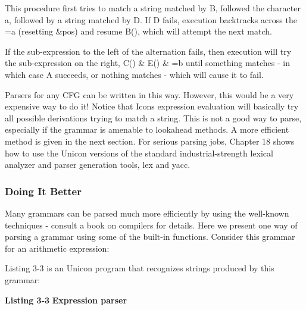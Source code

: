 This procedure first tries to match a string matched by \textsf{B},
followed the character \textsf{a}, followed by a string matched by
\textsf{D}. If \textsf{D} fails, execution
backtracks across the \textsf{={\textquotedbl}a{\textquotedbl}}
(resetting \textsf{\&pos}) and resume \textsf{B()}, which will attempt
the next match.

If the sub-expression to the left of the alternation fails, then execution will try the
sub-expression on the right, \textsf{C() \& E() \&
={\textquotedbl}b{\textquotedbl}} until something matches - in which
case \textsf{A} succeeds, or nothing matches - which will cause it to
fail.

Parsers for any CFG can be written in this way. However, this would be a
very expensive way to do it! Notice that Icon{\textquotesingle}s
expression evaluation will basically try all possible derivations
trying to match a string. This is not a good way to parse, especially
if the grammar is amenable to lookahead methods. A more efficient
method is given in the next section. For serious parsing jobs, Chapter
18 shows how to use the Unicon versions of the standard
industrial-strength lexical analyzer and parser generation tools, lex
and yacc.

\subsubsection[Doing It Better]{Doing It Better}

Many grammars can be parsed much more efficiently by using the
well-known techniques - consult a book on compilers for details. Here
we present one way of parsing a grammar using some of the built-in
functions. Consider this grammar for an arithmetic expression:


Listing 3-3 is an Unicon program that recognizes strings produced by
this grammar:

\bigskip

{\sffamily\bfseries Listing 3-3}
{\sffamily\bfseries Expression parser}

